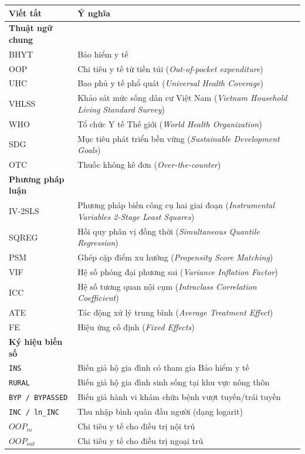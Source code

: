 \documentclass[12pt,a4paper]{article}
\begin{document}
\begin{table}[htbp]
	\centering
	\begin{tabular}{ll}
		\toprule
		\textbf{Viết tắt} & \textbf{Ý nghĩa} \\
		\midrule
		\textbf{Thuật ngữ chung} & \\
		BHYT & Bảo hiểm y tế \\
		OOP & Chi tiêu y tế từ tiền túi (\textit{Out-of-pocket expenditure}) \\
		UHC & Bao phủ y tế phổ quát (\textit{Universal Health Coverage}) \\
		VHLSS & Khảo sát mức sống dân cư Việt Nam (\textit{Vietnam Household Living Standard Survey}) \\
		WHO & Tổ chức Y tế Thế giới (\textit{World Health Organization}) \\
		SDG & Mục tiêu phát triển bền vững (\textit{Sustainable Development Goals}) \\
		OTC & Thuốc không kê đơn (\textit{Over-the-counter}) \\
		
		\addlinespace
		\textbf{Phương pháp luận} & \\
		IV-2SLS & Phương pháp biến công cụ hai giai đoạn (\textit{Instrumental Variables 2-Stage Least Squares}) \\
		SQREG & Hồi quy phân vị đồng thời (\textit{Simultaneous Quantile Regression}) \\
		PSM & Ghép cặp điểm xu hướng (\textit{Propensity Score Matching}) \\
		VIF & Hệ số phóng đại phương sai (\textit{Variance Inflation Factor}) \\
		ICC & Hệ số tương quan nội cụm (\textit{Intraclass Correlation Coefficient}) \\
		ATE & Tác động xử lý trung bình (\textit{Average Treatment Effect}) \\
		FE & Hiệu ứng cố định (\textit{Fixed Effects}) \\
		
		\addlinespace
		\textbf{Ký hiệu biến số} & \\
		\texttt{INS} & Biến giả hộ gia đình có tham gia Bảo hiểm y tế \\
		\texttt{RURAL} & Biến giả hộ gia đình sinh sống tại khu vực nông thôn \\
		\texttt{BYP / BYPASSED} & Biến giả hành vi khám chữa bệnh vượt tuyến/trái tuyến \\
		\texttt{INC / ln\_INC} & Thu nhập bình quân đầu người (dạng logarit) \\
		$OOP_{in}$ & Chi tiêu y tế cho điều trị nội trú \\
		$OOP_{out}$ & Chi tiêu y tế cho điều trị ngoại trú \\
		\bottomrule
	\end{tabular}
\end{table}
\end{document}
